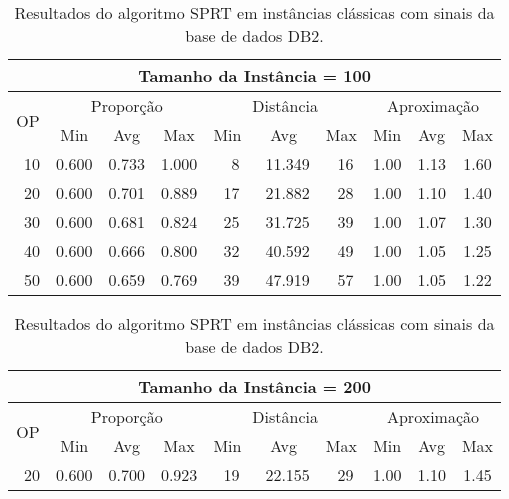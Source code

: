 \begin{table}[htbp]
\caption{Resultados do algoritmo SPRT em instâncias clássicas com sinais da base de dados DB2.}
\label{table:YDCKQRVK}
\begin{center}
\scriptsize
{\def\arraystretch{1.05}\tabcolsep=8pt
\begin{tabular}{|c|c|c|c|c|c|c|c|c|c|}
\hline
\multicolumn{10}{|c|}{\bf Tamanho da Instância = 100}                                                                          \\ \hline
\multirow{2}{*}{OP} & \multicolumn{3}{c|}{Proporção} & \multicolumn{3}{c|}{Distância} & \multicolumn{3}{c|}{Aproximação}   \\ \cline{2-10}
                    & Min       & Avg      & Max      & Min      & Avg      & Max     & Min     & Avg    & Max             \\ \hline
~10                 & 0.600     & 0.733    & 1.000    & ~~8      & ~11.349  & ~16     & 1.00    & 1.13   & 1.60            \\ \hline
~20                 & 0.600     & 0.701    & 0.889    & ~17      & ~21.882  & ~28     & 1.00    & 1.10   & 1.40            \\ \hline
~30                 & 0.600     & 0.681    & 0.824    & ~25      & ~31.725  & ~39     & 1.00    & 1.07   & 1.30            \\ \hline
~40                 & 0.600     & 0.666    & 0.800    & ~32      & ~40.592  & ~49     & 1.00    & 1.05   & 1.25            \\ \hline
~50                 & 0.600     & 0.659    & 0.769    & ~39      & ~47.919  & ~57     & 1.00    & 1.05   & 1.22            \\ \hline
\end{tabular}%
\vspace{5pt}
\begin{tabular}{|c|c|c|c|c|c|c|c|c|c|}
\hline
\multicolumn{10}{|c|}{\bf Tamanho da Instância = 200}                                                                          \\ \hline
\multirow{2}{*}{OP} & \multicolumn{3}{c|}{Proporção} & \multicolumn{3}{c|}{Distância} & \multicolumn{3}{c|}{Aproximação}   \\ \cline{2-10}
                    & Min       & Avg      & Max      & Min      & Avg      & Max     & Min     & Avg    & Max             \\ \hline
~20                 & 0.600     & 0.700    & 0.923    & ~19      & ~22.155  & ~29     & 1.00    & 1.10   & 1.45            \\ \hline

\end{tabular}}
\end{center}
\end{table}
